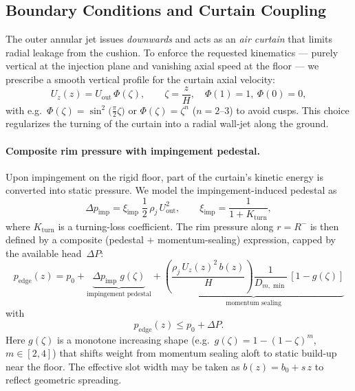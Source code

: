 \documentclass[11pt,a4paper]{article}
\begin{document}
\subsection{Boundary Conditions and Curtain Coupling} \label{sec:boundaryconditions}
The outer annular jet issues \emph{downwards} and acts as an \emph{air curtain} that limits radial leakage from the cushion. 
To enforce the requested kinematics --- purely vertical at the injection plane and vanishing axial speed at the floor --- we prescribe a smooth vertical profile for the curtain axial velocity:
\begin{equation}
  U_z(z) = U_{\mathrm{out}}\,\Phi\!\left(\zeta\right), 
  \qquad \zeta=\frac{z}{H},\quad \Phi(1)=1,\ \Phi(0)=0,
  \label{eq:Uz_profile}
\end{equation}
with e.g.\ $\Phi(\zeta)=\sin^2\!\big(\tfrac{\pi}{2}\zeta\big)$ or $\Phi(\zeta)=\zeta^n$ ($n=2$--$3$) to avoid cusps. 
This choice regularizes the turning of the curtain into a radial wall-jet along the ground.

\paragraph*{Composite rim pressure with impingement pedestal.}
Upon impingement on the rigid floor, part of the curtain's kinetic energy is converted into static pressure. 
We model the impingement-induced pedestal as
\begin{equation}
  \Delta p_{\mathrm{imp}}=\xi_{\mathrm{imp}}\;\frac{1}{2}\,\rho_j\,U_{\mathrm{out}}^2,
  \qquad 
  \xi_{\mathrm{imp}}=\frac{1}{1+K_{\mathrm{turn}}},
  \label{eq:delta_p_imp}
\end{equation}
where $K_{\mathrm{turn}}$ is a turning-loss coefficient. 
The rim pressure along $r=R^{-}$ is then defined by a composite (pedestal $+$ momentum-sealing) expression, capped by the available head~$\Delta P$:
\begin{equation}
  p_{\mathrm{edge}}(z)=p_0 
  + \underbrace{\Delta p_{\mathrm{imp}}\;g(\zeta)}_{\text{impingement pedestal}}
  + \underbrace{\left(\frac{\rho_j\,U_z(z)^2\,b(z)}{H}\right)\frac{1}{D_{m,\min}}\,[1-g(\zeta)]}_{\text{momentum sealing}}
\end{equation}
with
\begin{equation}
  p_{\mathrm{edge}}(z)\le p_0+\Delta P.
  \label{eq:pedestal_composite}
\end{equation}
Here $g(\zeta)$ is a monotone increasing shape (e.g.\ $g(\zeta)=1-(1-\zeta)^m$, $m\in[2,4]$) that shifts weight from momentum sealing aloft to static build-up near the floor. 
The effective slot width may be taken as $b(z)=b_0 + s\,z$ to reflect geometric spreading.
\end{document}
